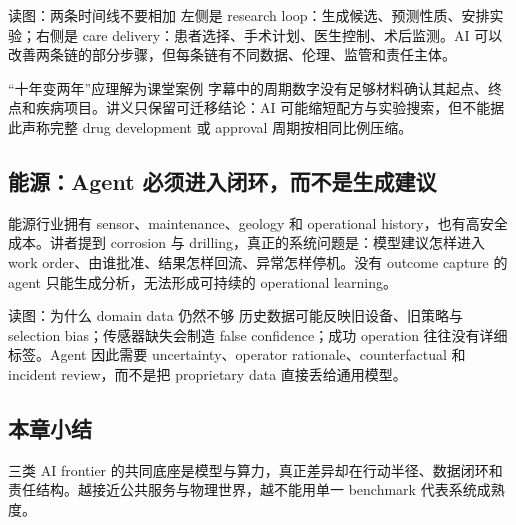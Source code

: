 
\begin{knowledgebox}{读图：两条时间线不要相加}
左侧是 research loop：生成候选、预测性质、安排实验；右侧是 care delivery：患者选择、手术计划、医生控制、术后监测。AI 可以改善两条链的部分步骤，但每条链有不同数据、伦理、监管和责任主体。
\end{knowledgebox}

\begin{warningbox}{“十年变两年”应理解为课堂案例}
字幕中的周期数字没有足够材料确认其起点、终点和疾病项目。讲义只保留可迁移结论：AI 可能缩短配方与实验搜索，但不能据此声称完整 drug development 或 approval 周期按相同比例压缩。
\end{warningbox}

\subsection{能源：Agent 必须进入闭环，而不是生成建议}

能源行业拥有 sensor、maintenance、geology 和 operational history，也有高安全成本。讲者提到 corrosion 与 drilling，真正的系统问题是：模型建议怎样进入 work order、由谁批准、结果怎样回流、异常怎样停机。没有 outcome capture 的 agent 只能生成分析，无法形成可持续的 operational learning。


\begin{knowledgebox}{读图：为什么 domain data 仍然不够}
历史数据可能反映旧设备、旧策略与 selection bias；传感器缺失会制造 false confidence；成功 operation 往往没有详细标签。Agent 因此需要 uncertainty、operator rationale、counterfactual 和 incident review，而不是把 proprietary data 直接丢给通用模型。
\end{knowledgebox}


\subsection{本章小结}

三类 AI frontier 的共同底座是模型与算力，真正差异却在行动半径、数据闭环和责任结构。越接近公共服务与物理世界，越不能用单一 benchmark 代表系统成熟度。

